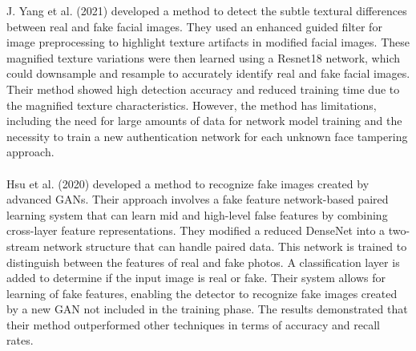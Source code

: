 J. Yang et al. (2021)\cite{yang2021detecting} developed a method to detect the subtle textural differences between real and fake facial images. They used an enhanced guided filter for image preprocessing to highlight texture artifacts in modified facial images. These magnified texture variations were then learned using a Resnet18 network, which could downsample and resample to accurately identify real and fake facial images. Their method showed high detection accuracy and reduced training time due to the magnified texture characteristics. However, the method has limitations, including the need for large amounts of data for network model training and the necessity to train a new authentication network for each unknown face tampering approach.\\\\
Hsu et al. (2020) \cite{hung2021multi} developed a method to recognize fake images created by advanced GANs. Their approach involves a fake feature network-based paired learning system that can learn mid and high-level false features by combining cross-layer feature representations. They modified a reduced DenseNet into a two-stream network structure that can handle paired data. This network is trained to distinguish between the features of real and fake photos. A classification layer is added to determine if the input image is real or fake. Their system allows for learning of fake features, enabling the detector to recognize fake images created by a new GAN not included in the training phase. The results demonstrated that their method outperformed other techniques in terms of accuracy and recall rates.

\newpage
